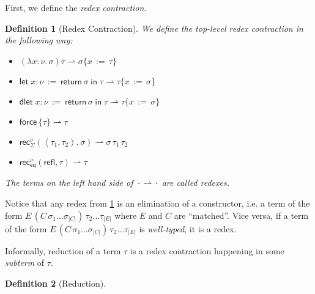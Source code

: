 \documentclass[a4,natbib=false]{article}
\newtheorem{definition}{Definition}
\newcommand{\fun}[2]{\lambda {#1}.\,{#2}}
\newcommand{\letname}{\mathsf{let}}
\newcommand{\dletname}{\mathsf{dlet}}
\newcommand{\letval}[3]{\letname\; {#1} \,:=\, {#2} \;\mathsf{in}\; {#3}}
\newcommand{\dletval}[3]{\dletname\; {#1} \,:=\, {#2} \;\mathsf{in}\; {#3}}
\newcommand{\pair}[2]{\left\langle{#1}, {#2}\right\rangle}
\newcommand{\refl}{\mathsf{refl}}
\newcommand{\force}[1]{\mathsf{force}\,{#1}}
\newcommand{\return}[1]{\mathsf{return}\,{#1}}
\newcommand{\thunk}[1]{\{{#1}\}}
\newcommand{\recsigma}[3]{\mathsf{rec}_{\Sigma}^{#2}({#1},{#3})}
\newcommand{\receq}[3]{\mathsf{rec}_{\mathsf{eq}}^{#2}({#1},{#3})}
\newcommand{\subst}[3]{{#1}\{{#2}\,:=\,{#3}\}}
\newcommand{\spcdot}{\mkern 2mu\cdot\mkern 2mu}
\newcommand{\reduces}[2]{{#1} \rightarrow {#2}}
\newcommand{\contracts}[2]{{#1} \rightharpoonup {#2}}
\newcommand{\narg}[1]{|{#1}|}
\newcommand{\fullterm}[2]{{#1}\,#2_1 \dots #2_{\narg{#1}}}
\newcommand{\Infer}[3]{\inferrule*[right={#1}]{#2}{#3}}
\begin{document}
First, we define the \emph{redex contraction}.
\begin{definition}[Redex Contraction]
  \label{def:redex-contr}
  We define the top-level redex contraction in the following way:
  \begin{multicols}{2}
    \begin{itemize}

    \item $\contracts{(\fun{x:\nu}{\sigma})\tau}{\subst{\sigma}{x}{\tau}}$
      
    \item $\contracts{\letval{x:\nu}{\return{\sigma}}{\tau}}{\subst{\tau}{x}{\sigma}}$

    \item $\contracts{\dletval{x:\nu}{\return{\sigma}}{\tau}}{\subst{\tau}{x}{\sigma}}$

    \item $\contracts{\force{\thunk{\tau}}}{\tau}$

    \item $\contracts{\recsigma{\pair{\tau_1}{\tau_2}}{\nu}{\sigma}}{\sigma \,
        \tau_1 \, \tau_2}$

    \item $\contracts{\receq{\refl}{\nu}{\tau}}{\tau}$

    \end{itemize}
  \end{multicols}

  The terms on the left hand side of $\contracts{\spcdot}{\spcdot}$ are called \emph{redexes}.
  
\end{definition}

Notice that any redex from \cref{def:redex-contr} is an elimination of a
constructor, i.e. a term of the form $E\,(\fullterm{C}{\sigma})\, \tau_2 \dots
\tau_{\narg{E}}$ where $E$ and $C$ are ``matched''.
Vice versa, if a term of the form
$E\,(\fullterm{C}{\sigma})\, \tau_2 \dots \tau_{\narg{E}}$ is
\emph{well-typed}, it is a redex. 


Informally, reduction of a term $\tau$ is a redex contraction happening in some
\emph{subterm} of $\tau$.

\begin{definition}[Reduction]

\end{definition}
\end{document}
